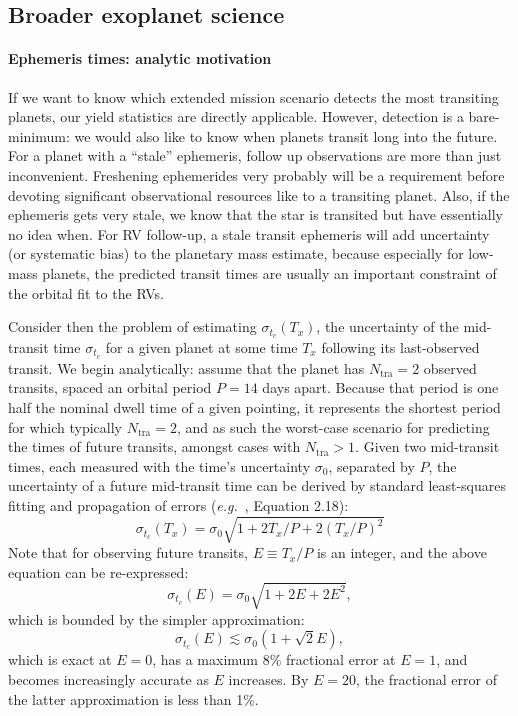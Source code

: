 \subsection{Broader exoplanet science}
\label{sec:broader_exoplanet_science}

\paragraph{Ephemeris times: analytic motivation}
\label{sec:ephemeris_timing_analytic}
If we want to know which extended mission scenario detects the most transiting planets, our yield statistics are directly applicable.
However, detection is a bare-minimum: we would also like to know when \tess planets transit long into the future.
For a planet with a ``stale'' ephemeris, follow up observations are more than just inconvenient.
Freshening ephemerides very probably will be a requirement before devoting significant observational resources like \jwst to a transiting planet.
Also, if the ephemeris gets very stale, we know that the star is transited but have essentially no idea when. 
For RV follow-up, a stale transit ephemeris will add uncertainty (or systematic bias) to the planetary mass estimate, because especially for low-mass planets, the predicted transit times are usually an important constraint of the orbital fit to the RVs.

Consider then the problem of estimating $\sigma_{t_c}(T_x)$, the uncertainty of the mid-transit time $\sigma_{t_c}$ for a given planet at some time $T_x$ following its last-observed transit. 
We begin analytically: assume that the planet has $N_\mathrm{tra}=2$ observed transits, spaced an orbital period $P=14$ days apart. Because that period is one half the nominal \tess dwell time of a given pointing, it represents the shortest period for which typically $N_\mathrm{tra}=2$, and as such the worst-case scenario for predicting the times of future transits, amongst cases with $N_\mathrm{tra}>1$.
Given two mid-transit times, each measured with the time's uncertainty $\sigma_0$, separated by $P$, the uncertainty of a future mid-transit time can be derived by standard least-squares fitting and propagation of errors (\textit{e.g.}~\citet{lyons_practical_1991}, Equation 2.18):
\begin{equation}
\sigma_{t_c}(T_x) = \sigma_0 \sqrt{1 + 2 T_x / P + 2 (T_x / P)^2 }
\end{equation}
Note that for observing future transits, $E \equiv T_x / P$ is an integer, and the above equation can be re-expressed:
\begin{equation}
\sigma_{t_c}(E) = \sigma_0 \sqrt{1 + 2 E + 2 E^2 },
\end{equation}
which is bounded by the simpler approximation: 
\begin{equation}
\sigma_{t_c}(E) \lesssim \sigma_0 \left(1+\sqrt{2} E\right), 
\end{equation}
which is exact at $E=0$, has a maximum 8\% fractional error at $E=1$, and becomes increasingly accurate as $E$ increases. By $E=20$, the fractional error of the latter approximation is less than 1\%.

